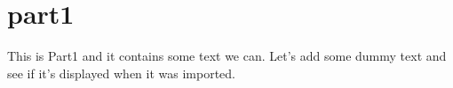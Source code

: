 \section{part1}
This is Part1 and it contains some text we can. Let's add some dummy text 
and see if it's displayed when it was imported.
\blindtext[5]